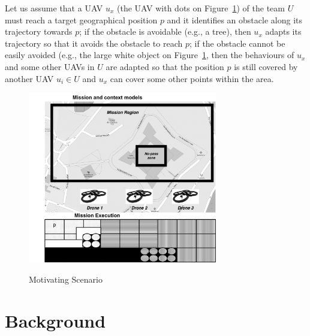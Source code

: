 \documentclass[journal]{IEEEtran}
\theoremstyle{definition}
\newcommand\patrizio[1]{\nb{Patrizio}{#1}}
\begin{document}

Let us assume that a UAV $u_x$ (the UAV with dots on Figure~\ref{fig:Scenario}) of the team $U$ must reach a target geographical position $p$ and it identifies an obstacle along its trajectory towards $p$; if the obstacle is avoidable (e.g., a tree), then $u_x$ adapts its trajectory so that it avoids the obstacle to reach $p$; if the obstacle cannot be easily avoided (e.g., the large white object on Figure~\ref{fig:Scenario},
then the behaviours of $u_x$ and some other UAVs in $U$ are adapted so that the position $p$ is still covered by another UAV $u_i \in U$ and $u_x$ can cover some other points within the area.  

\begin{figure}[h]

\includegraphics[width=3.25in]{Figures/Scenario_M.png}
\label{fig:second}
\caption{Motivating Scenario}\label{fig:Scenario}
\end{figure}


  


\section{Background}
\end{document}
